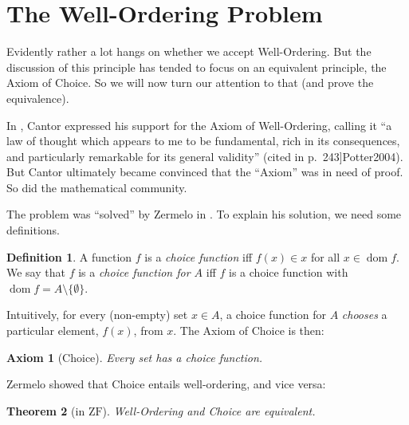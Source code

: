 \documentclass[10pt,a4paper]{article}
\theoremstyle{plain}
\newtheorem{thm}{Theorem}[section]
\newtheorem{axiom}{Axiom}
\theoremstyle{definition}
\newtheorem{defn}[thm]{Definition}
\theoremstyle{remark}
\newcommand*{\olfileid}[3]{}
\newcommand*{\olsection}[1]{\section*{#1}}
\newcommand*{\ollabel}[1]{\label{#1}}
\providecommand{\ZF}{\mathrm{ZF}}
\providecommand{\dom}{\operatorname{dom}}
\providecommand{\citeauthor}[1]{\cite{#1}}
\providecommand{\citeyear}[1]{\cite{#1}}
\begin{document}


\olfileid{sth}{choice}{woproblem}
\olsection{The Well-Ordering Problem}

Evidently rather a lot hangs on whether we accept Well-Ordering. But
the discussion of this principle has tended to focus on an equivalent
principle, the Axiom of Choice. So we will now turn our attention to
that (and prove the equivalence). 

In \citeyear{Cantor1883}, Cantor expressed his support for the Axiom
of Well-Ordering, calling it ``a law of thought which appears to me to
be fundamental, rich in its consequences, and particularly remarkable
for its general validity'' (cited in \citeauthor{Potter2004}
\citeyear[p.~243]{Potter2004}). But Cantor ultimately became convinced
that the ``Axiom'' was in need of proof. So did the mathematical
community. 

The problem was ``solved'' by Zermelo in \citeyear{Zermelo1904}. To
explain his solution, we need some definitions. 

\begin{defn}
A function $f$ is a \emph{choice function} iff $f(x) \in x$ for all $x \in \dom{f}$. We say that $f$ is a \emph{choice function for $A$} iff $f$ is a choice function with $\dom{f} = A \setminus \{\emptyset\}$.
\end{defn}

Intuitively, for every (non-empty) set $x \in A$, a choice function
for $A$ \emph{chooses} a particular element, $f(x)$, from $x$. The
Axiom of Choice is then:

\begin{axiom}[Choice]
	Every set has a choice function.
\end{axiom}

Zermelo showed that Choice entails well-ordering, and vice versa:

\begin{thm}[in $\ZF$]\ollabel{thmwochoice}
Well-Ordering and Choice are equivalent.
\end{thm}
\end{document}
